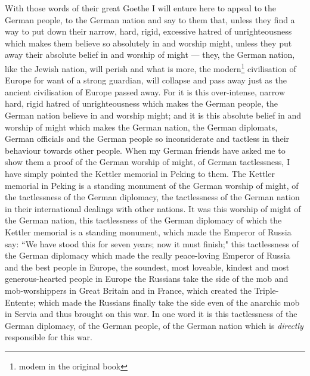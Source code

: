 With those words of their great Goethe I will enture  here to appeal to the German people, to the German nation and say to them that, unless they find a way to put down their narrow, hard, rigid, excessive hatred of unrighteousness which makes them believe so absolutely in and worship might, unless they put away their absolute belief in and worship of might --- they, the German nation, like the Jewish nation, will perish and what is more, the modern\footnote{modem in the original book} civilisation of Europe for want of a strong guardian, will collapse and pass away just as the ancient civilisation of Europe passed away.
For it is this over-intense, narrow hard, rigid hatred of unrighteousness which makes the German people, the German nation believe in and worship might; and it is this absolute belief in and worship of might which makes the German nation, the German diplomats, German officials and the German people so inconsiderate and tactless in their behaviour towards other people.
When my German friends have asked me to show them a proof of the German worship of might, of German tactlessness, I have simply pointed the Kettler memorial  in Peking to them.
The Kettler memorial in Peking is a standing monument of the German worship of might, of the tactlessness of the German diplomacy, the tactlessness of the German nation in their international dealings with other nations\cite{num9}.  
It was this worship of might of the German nation, this tactlessness of the German diplomacy of which the Kettler memorial is a standing monument, which made the Emperor of Russia say: ``We have stood this for seven years; now it must finish;" this tactlessness of the German diplomacy which made the really peace-loving Emperor of Russia and the best people in Europe, the soundest, most loveable, kindest and most generous-hearted people in Europe the Russians take the side of the mob and mob-worshippers in Great Britain and in France, which created the Triple-Entente;  which made the Russians finally take the side even of the anarchic mob in Servia and thus brought on this war.
In one word it is this tactlessness of the German diplomacy, of the German people, of the German nation which is \emph{directly} responsible for this war.

